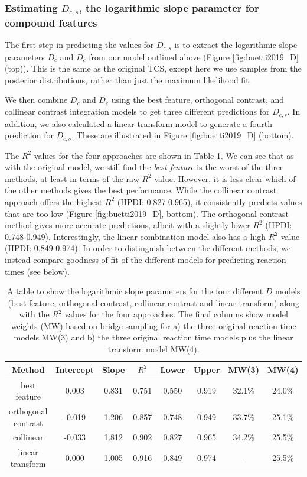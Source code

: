 \documentclass[preprint,12pt,authoryear]{elsarticle}
\begin{document}
\subsubsection{Estimating $D_{c,s}$, the logarithmic slope parameter for compound features}

The first step in predicting the values for $D_{c,s}$ is to extract the logarithmic slope parameters $D_c$ and $D_c$ from our model outlined above (Figure \ref{fig:buetti2019_D} (top)). This is the same as the original TCS, except here we use samples from the posterior distributions, rather than just the maximum likelihood fit. 

We then combine $D_c$ and $D_c$ using the best feature, orthogonal contrast, and collinear contrast integration models to get three different predictions for $D_{c,s}$. In addition, we also calculated a linear transform model to generate a fourth prediction for $D_{c,s}$. These are illustrated in Figure \ref{fig:buetti2019_D} (bottom).

The $R^2$ values for the four approaches are shown in Table \ref{tab:reimp_D_r2}. We can see that as with the original model, we still find the \textit{best feature} is the worst of the three methods, at least in terms of the raw $R^2$ value. However, it is less clear which of the other methods gives the best performance. While the collinear contrast approach offers the highest $R^2$ (HPDI: 0.827-0.965), it consistently predicts values that are too low (Figure \ref{fig:buetti2019_D}, bottom). The orthogonal contrast method gives more accurate predictions, albeit with a slightly lower $R^2$ (HPDI: 0.748-0.949). Interestingly, the linear combination model also has a high $R^2$ value (HPDI: 0.849-0.974). In order to distinguish between the different methods, we instead compare goodness-of-fit of the different models for predicting reaction times (see below).

\begin{table}[ht]
\small
\centering
\begin{tabular}{ c|cc|ccc|cc } 
Method & Intercept & Slope & $R^2$ & Lower & Upper & MW(3) & MW(4) \\
 \hline 
best feature & 0.003 & 0.831 & 0.751 & 0.550 & 0.919 & 32.1\% & 24.0\%\\ 
orthogonal contrast & -0.019 & 1.206 & 0.857 & 0.748 & 0.949 & 33.7\% & 25.1\%\\ 
collinear & -0.033 & 1.812	& 0.902 & 0.827 & 0.965 & 34.2\% & 25.5\%\\
linear transform & 0.000 & 1.005 & 0.916 & 0.849 & 0.974 & - & 25.5\%\\
\end{tabular}
\caption{A table to show the logarithmic slope parameters for the four different $D$ models (best feature, orthogonal contrast, collinear contrast and linear transform) along with the $R^2$ values for the four approaches. The final columns show model weights (MW) based on bridge sampling for a) the three original reaction time models MW(3) and b) the three original reaction time models plus the linear transform model MW(4).}
\label{tab:reimp_D_r2}
\end{table}
\end{document}

